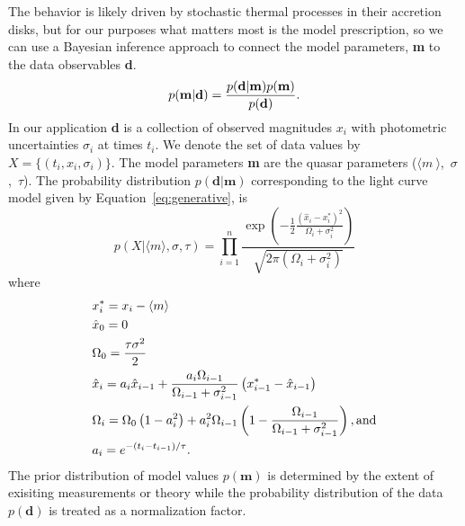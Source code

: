 \documentclass{emulateapj}
\begin{document}

The behavior is likely
driven by stochastic thermal processes in their accretion disks, but
for our purposes what matters most is the model prescription, so we
can use a Bayesian inference approach to connect the model parameters,
{\bf m} to the data observables {\bf d}.
\begin{equation}
p({\mathbf m} | {\mathbf d}) = 
{{p({\mathbf d} | {\mathbf m})p({\mathbf m})}
\over{p({\mathbf  d})}}. \nonumber 
\end{equation}
In our application {\bf d} is a collection of observed magnitudes ${x_{i}}$ with 
photometric uncertainties $\sigma_i$ at times ${t_i}$. We denote the set of data values by $X=\{(t_i,x_i,\sigma_i)\}$. The model parameters {\bf m} are 
the quasar parameters ($\langle m~\rangle$,~$\sigma$,~$\tau$). The probability distribution 
$p({\mathbf d} | {\mathbf m})$ corresponding to the light curve model given by Equation~\ref{eq:generative}, 
is 
\begin{equation} 
p(X|\langle m\rangle, \sigma,\tau) =
\prod_{i=1}^{n}
\frac{
\exp\left(-\frac{1}{2}%
\frac{\left(\hat{x}_i-x^{*}_i\right)^2}{\Omega_i+\sigma_i^2} 
\right)
}
{
\sqrt{2\pi\left(\Omega_i+\sigma_i^2\right)}
}
\end{equation}
where 
\begin{alignat}{1}
& x_{i}^{*} = x_i-\langle m \rangle \nonumber\\
& \hat{x}_0 = 0   \nonumber\\
& \Omega_{0}=\frac{\tau\sigma^2}{2} \nonumber\\
& \hat{x}_i = a_i\hat{x}_{i-1} + \frac{a_i\Omega_{i-1}}{\Omega_{i-1}+\sigma^2_{i-1}} \left(x^{*}_{i-1}-\hat{x}_{i-1}\right) \nonumber\\
& \Omega_{i}=\Omega_{0}\left(1-a_{i}^2\right) +
a_{i}^2\Omega_{i-1}\left(1-\frac{\Omega_{i-1}}{\Omega_{i-1}+\sigma_{i-1}^2}\right),
{\rm and} \nonumber\\
& a_i = e^{-\left(t_i-t_{i-1}\right)/\tau}. \nonumber
\end{alignat}
The prior distribution of model values $p(\mathbf{m})$ is determined by the extent of exisiting measurements or theory while the probability distribution of the data $p(\mathbf{d})$ is treated as a normalization factor.
\end{document}
